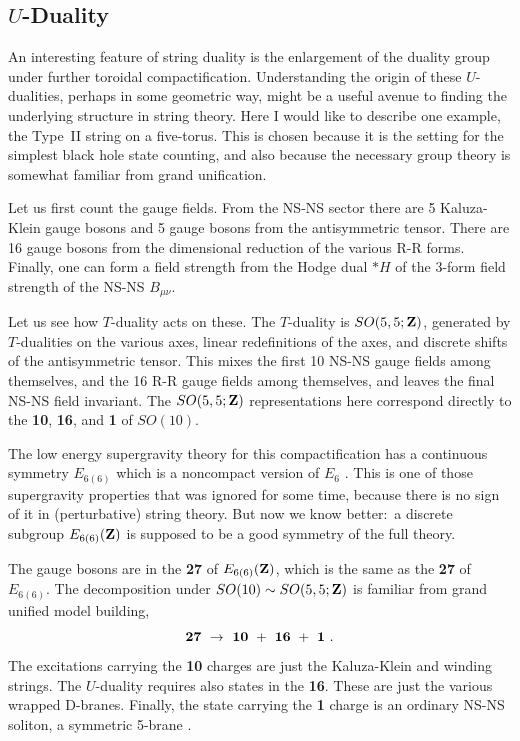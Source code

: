 \documentclass[12pt]{article}
\def\be{\begin{equation}}
\def\ee{\end{equation}}
\def\Z{{\bf Z}}
\begin{document}
\subsection{$U$-Duality}

An interesting feature of string duality is the enlargement of the duality
group under further toroidal compactification.  Understanding the origin of
these $U$-dualities, perhaps in some geometric way, might be a useful avenue
to finding the underlying structure in string theory.  Here I would like to
describe one example, the Type~II string on a five-torus.  This is chosen
because it is the setting for the simplest black hole state counting, and
also because the necessary group theory is somewhat familiar from grand
unification.

Let us first count the gauge fields.  From the NS-NS sector there are 5
Kaluza-Klein gauge bosons and 5 gauge bosons from the antisymmetric tensor. 
There are 16 gauge bosons from the dimensional reduction of the various R-R
forms.  Finally, one can form a field strength from the Hodge dual $*H$ of
the 3-form field strength of the NS-NS $B_{\mu\nu}$.

Let us see how $T$-duality acts on these.  The $T$-duality is $SO(5,5;\Z)$,
generated by $T$-dualities on the various axes, linear redefinitions of the
axes, and discrete shifts of the antisymmetric tensor.  This mixes the first
10 NS-NS gauge fields among themselves, and the 16 R-R gauge fields among
themselves, and leaves the final NS-NS field invariant.
The $SO(5,5;\Z)$ representations here correspond directly to the {\bf 10},
{\bf 16}, and {\bf 1} of $SO(10)$.

The low energy supergravity theory for this compactification has a
continuous symmetry $E_{6(6)}$ which is a noncompact version of
$E_6$ \cite{julia}.  This is one of those supergravity properties that was
ignored for some time, because there is no sign of it in (perturbative)
string theory. But now we know better:\, \cite{hullt} a discrete subgroup
$E_{6(6)}(\Z)$ is supposed to be a good symmetry of the full theory.

The gauge bosons are in the {\bf 27} of $E_{6(6)}(\Z)$, which is the same as
the {\bf 27} of $E_{6(6)}$.  The decomposition under $SO(10)
\sim SO(5,5;\Z)$ is familiar from grand unified model building,
\be
{\bf 27}\ \to\ {\bf 10}\ +\ {\bf 16}\ +\ {\bf 1}\ .
\ee
The excitations carrying the {\bf 10} charges are just the Kaluza-Klein and
winding strings.  The $U$-duality requires also states in the {\bf 16}.
These are just the various wrapped D-branes.  Finally, the state
carrying the {\bf 1} charge is an ordinary NS-NS soliton, a symmetric
5-brane \cite{chs}.
\end{document}
